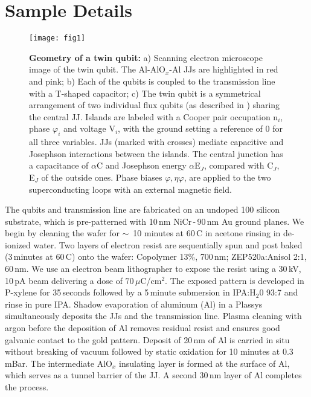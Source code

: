 \section{Sample Details}

\begin{figure}[h]
  \texttt{[image: fig1]}
  \caption{\small \textbf{Geometry of a twin qubit:} a) Scanning electron microscope image of
    the twin  qubit. The Al-AlO$_x$-Al JJs  are highlighted in red  and pink; b) Each  of the
    qubits is coupled to  the transmission line with a T-shaped capacitor;  c) The twin qubit
    is  a   symmetrical  arrangement  of  two   individual  flux  qubits  (as   described  in
    \cite{orlando1999})  sharing the  central JJ.   Islands are  labeled with  a Cooper  pair
    occupation n$_i$, phase $\varphi_i$ and voltage V$_i$, with the ground setting a reference of 0
    for all  three variables.   JJs (marked  with crosses)  mediate capacitive  and Josephson
    interactions between  the islands.  The  central junction has  a capacitance of  $\alpha$C and
    Josephson  energy $  \alpha$E$_{J}$, compared  with C$_J$,  E$_J$ of  the outside  ones. Phase
    biases $\varphi, \eta \varphi$,  are applied to the two superconducting loops  with an external magnetic
    field.}
  \label{fig:setup}
\end{figure}

\noindent  The  qubits  and transmission  line  are  fabricated  on  an undoped  100  silicon
substrate, which is  pre-patterned with 10\,nm NiCr\,-\,90\,nm Au ground  planes. We begin by
cleaning the wafer for  $\sim$~10 minutes at 60\,C in acetone rinsing  in de-ionized water.  Two
layers of electron resist are sequentially spun and post baked (3\,minutes at 60\,C) onto the
wafer:  {Copolymer 13\%},  700\,nm;  ZEP520a:Anisol 2:1,  60\,nm.  We  use  an electron  beam
lithographer  to  expose  the resist  using  a  30\,kV,  10\,pA  beam delivering  a  dose  of
$ 70\,\mu $C/cm$^2$.  The exposed pattern is  developed in P-xylene for 35\,seconds followed by
a 5\,minute  submersion in  IPA:H$_2$0 93:7  and rinse  in pure  IPA.  Shadow  evaporation of
aluminum (Al) in a Plassys simultaneously deposits the JJs and the transmission line.  Plasma
cleaning with  argon before  the deposition of  Al removes residual  resist and  ensures good
galvanic contact  to the gold  pattern. Deposit of  20\,nm of Al  is carried in  situ without
breaking of vacuum followed by static oxidation for 10 minutes at 0.3\,mBar. The intermediate
AlO$_x$ insulating layer is formed at the surface  of Al, which serves as a tunnel barrier of
the JJ.  A second 30\,nm layer of Al completes the process.

